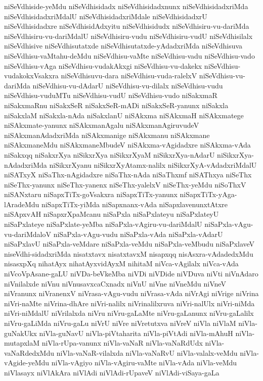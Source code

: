 {niSeVdhiside-yeMdu
niSeVdhisidadx
niSeVdhisidadxnunx
niSeVdhisidadxriMda
niSeVdhisidadxriMdalU
niSeVdhisidadxriMdale
niSeVdhisidadxrU
niSeVdhisidadxre
niSeVdhisidAdxyitu
niSeVdhisidudx
niSeVdhisiru-vu-dariMda
niSeVdhisiru-vu-dariMdalU
niSeVdhisiru-vudu
niSeVdhisiru-vudU
niSeVdhisilalx
niSeVdhisive
niSeVdhisutatxde
niSeVdhisutatxde-yAdadxriMda
niSeVdhisuva
niSeVdhisu-vaMtahu-deMdu
niSeVdhisu-vaMte
niSeVdhisu-vadu
niSeVdhisu-vado
niSeVdhisu-vAga
niSeVdhisu-vudakAkxgi
niSeVdhisu-vu-dakekx
niSeVdhisu-vudakokxVsakxra
niSeVdhisuvu-dara
niSeVdhisu-vuda-ralelxV
niSeVdhisu-vu-dariMda
niSeVdhisu-vu-dAdarU
niSeVdhisu-vu-dilalx
niSeVdhisu-vudu
niSeVdhisu-vuduMTu
niSeVdhisu-vudU
niSeVdhisu-vudo
niSakxmaR
niSakxmaRnu
niSakxSeR
niSakxSeR-mADi
niSakxSeR-yanunx
niSakxla
niSakxlaM
niSakxla-nAda
niSakxlanU
niSAkxma
niSAkxmaH
niSAkxmatege
niSAkxmate-yanunx
niSAkxmanAgalu
niSAkxmanAgiruvudeV
niSAkxmanAdadxriMda
niSAkxmanige
niSAkxmanu
niSAkxmane
niSAkxmaneMdu
niSAkxmaneMbudeV
niSAkxma-vAgidadxre
niSAkxma-vAda
niSakxqq
niSakxrXya
niSikxrXya
niSikxrXyaM
niSikxrXya-nAdarU
niSikxrXya-nAdadxriMda
niSikxrXyanu
niSikxrXyAtamx-nalilx
niSikxrXyA-vAdadxriMdalU
niSATxyX
niSaThx-nAgidadxre
niSaThx-nAda
niSaThxmf
niSAThxya
niSeThx
niSeThx-yanunx
niSeThx-yanenx
niSeThx-yalelxV
niSeThx-yeMdu
niSoThxV
niSANxtaru
niSapxTiTx-goVsakxra
niSapxTiTx-yanunx
niSapxTiTx-yAga-lAradeMdu
niSapxTiTx-yiMda
niSapxnanx-vAda
niSapxlavenunxtAtxre
niSApxvAH
niSapxrXpaMcanu
niSaPxla
niSaPxlateyu
niSaPxlateyU
niSaPxlateye
niSaPxlate-yeMba
niSaPxla-vAgiru-vu-dariMdalU
niSaPxla-vAgu-vu-dariMdaloV
niSaPxla-vAgu-vudu
niSaPxla-vAda
niSaPxla-vAdarU
niSaPxlavU
niSaPxla-veMdare
niSaPxla-veMdu
niSaPxla-veMbudu
niSaPxlaveV
niseVdhi-sidadxriMda
nisatxtavx
nisatxtavxM
nisapxqq
nisAsxra-vAdadedxMdu
nisasxpXq
nihatAyx
nihatAyxvidAyxM
nihitaM
niVca-vAgilalx
niVca-vAda
niVcoVpAsane-gaLU
niVDa-beVkeMba
niVDi
niVDide
niVDuva
niVti
niVnAdaro
niVnilalxde
niVnu
niVnusavxcaCxnadx
niVnU
niVne
niVneMdu
niVneV
niVranunx
niVranenxV
niVrasa-vAgu-vudu
niVrasa-vAda
niVrAgi
niVrige
niVrina
niVri-naMte
niVrina-dhAre
niVri-nalilx
niVrinalilxruva
niVri-nalUlx
niVri-niMda
niVri-niMdalU
niVrilalxda
niVru
niVru-gaLaMte
niVru-gaLanunx
niVru-gaLalilx
niVru-gaLiMda
niVru-gaLu
niVrU
niVre
niVretutxva
niVreV
niVla
niVlaM
niVla-guNakUkx
niVla-guNavU
niVla-piVtaharita
niVla-piVtAdi
niVla-mAhuH
niVla-mutapxlaM
niVla-rUpa-vanunx
niVla-vaNaR
niVla-vaNaRdUdx
niVla-vaNaRdedxMdu
niVla-vaNaR-vilalxda
niVla-vaNaRvU
niVla-valalx-veMdu
niVla-vAgide-yeMdu
niVla-vAgiyo
niVla-vAgiru-vaMte
niVla-vAda
niVla-veMdu
niVlasayx
niVlAkAra
niVlAdi
niVlAdi-rUpaveV
niVlAdi-viSaya-gaLa
}
